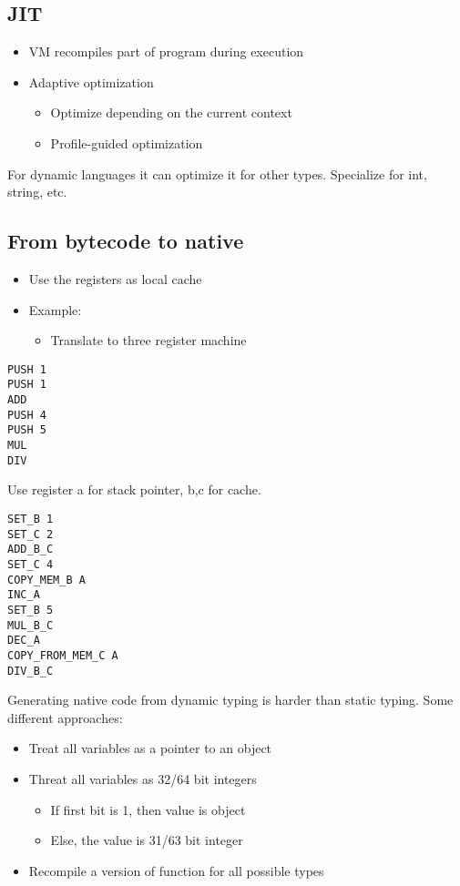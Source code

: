 \documentclass[a4paper]{article}
\begin{document}
\subsection{JIT}
\begin{itemize}
    \item VM recompiles part of program during execution
    \item Adaptive optimization
        \begin{itemize}
            \item Optimize depending on the current context
            \item Profile-guided optimization
        \end{itemize}
\end{itemize}
For dynamic languages it can optimize it for other types. Specialize for int,
string, etc. 
\subsection{From bytecode to native}
\begin{itemize}
    \item Use the registers as local cache
    \item Example:
        \begin{itemize}
            \item Translate to three register machine
        \end{itemize}
\end{itemize}
\begin{verbatim}
PUSH 1
PUSH 1
ADD
PUSH 4
PUSH 5
MUL
DIV
\end{verbatim}
Use register a for stack pointer, b,c for cache.
\begin{verbatim}
SET_B 1
SET_C 2
ADD_B_C
SET_C 4
COPY_MEM_B A
INC_A
SET_B 5
MUL_B_C
DEC_A
COPY_FROM_MEM_C A
DIV_B_C
\end{verbatim}
Generating native code from dynamic typing is harder than static typing.
Some different approaches:
\begin{itemize}
    \item Treat all variables as a pointer to an object
    \item Threat all variables as 32/64 bit integers
        \begin{itemize}
            \item If first bit is 1, then value is object
            \item Else, the value is 31/63 bit integer
        \end{itemize}
    \item Recompile a version of function for all possible types
\end{itemize}
\end{document}
